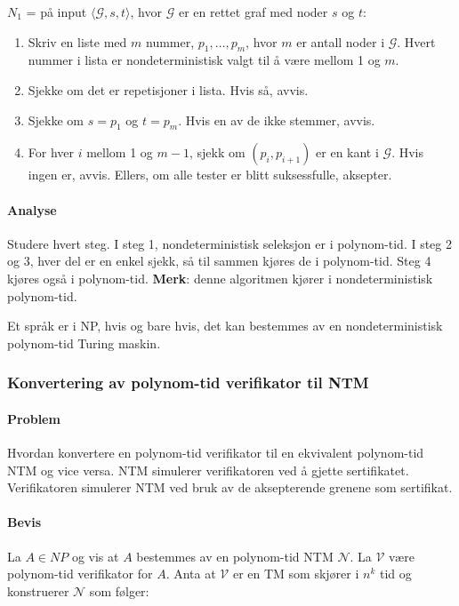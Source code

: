 \documentclass[11pt,a4paper]{article}
\begin{document}
$N_1$ = på input $\langle \mathcal{G},s,t \rangle$, hvor $\mathcal{G}$ er en rettet graf med noder $s$ og $t$:
\begin{enumerate}
\item{Skriv en liste med $m$ nummer, $p_1,\dots, p_m$}, hvor $m$ er antall noder i $\mathcal{G}$. Hvert nummer i lista er nondeterministisk valgt til å være mellom 1 og $m$.
\item{Sjekke om det er repetisjoner i lista. Hvis så, avvis.}
\item{Sjekke om $s = p_1$ og $t = p_m$. Hvis en av de ikke stemmer, avvis.}
\item{For hver $i$ mellom 1 og $m-1$, sjekk om $(p_i, p_{i+1})$ er en kant i $\mathcal{G}$. Hvis ingen er, avvis. Ellers, om alle tester er blitt suksessfulle, aksepter.}
\end{enumerate}

\paragraph{Analyse} Studere hvert steg. I steg 1, nondeterministisk seleksjon er i polynom-tid. I steg 2 og 3, hver del er en enkel sjekk, så til sammen kjøres de i polynom-tid. Steg 4 kjøres også i polynom-tid. \textbf{Merk}: denne algoritmen kjører i nondeterministisk polynom-tid.

Et språk er i NP, hvis og bare hvis, det kan bestemmes av en nondeterministisk polynom-tid Turing maskin.

\subsubsection{Konvertering av polynom-tid verifikator til NTM}
\paragraph{Problem} Hvordan konvertere en polynom-tid verifikator til en ekvivalent polynom-tid NTM og vice versa. NTM simulerer verifikatoren ved å gjette sertifikatet. Verifikatoren simulerer NTM ved bruk av de aksepterende grenene som sertifikat.

\paragraph{Bevis} La $A \in NP$ og vis at $A$ bestemmes av en polynom-tid NTM $\mathcal{N}$. La $\mathcal{V}$ være polynom-tid verifikator for $A$. Anta at $\mathcal{V}$ er en TM som skjører i $n^k$ tid og konstruerer $\mathcal{N}$ som følger:
\end{document}
